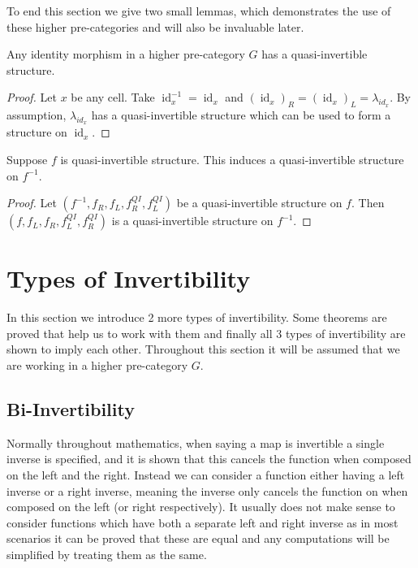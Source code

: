 \documentclass[draft]{article}
\theoremstyle{definition} \newtheorem{definition}{Definition}
\theoremstyle{remark} \newtheorem{remark}{Remark}
\DeclareMathOperator{\id}{id}
\newcommand{\inv}[1]{#1^{-1}} \newcommand{\comp}{\star}
\begin{document}
To end this section we give two small lemmas, which demonstrates the
use of these higher pre-categories and will also be invaluable later.

\begin{lemma}\label{identity}
  Any identity morphism in a higher pre-category \(G\) has a
  quasi-invertible structure.
\end{lemma}

\begin{proof}
  Let \(x\) be any cell. Take \(\inv {\id_x} = \id_x\) and
  \({(\id_x)}_R = {(\id_x)}_L = \lambda_{id_x}\). By assumption,
  \(\lambda_{id_x}\) has a quasi-invertible structure which can be
  used to form a structure on \(\id_x\).
\end{proof}

\begin{lemma}\label{inverse-invert}
  Suppose \(f\) is quasi-invertible structure. This induces a
  quasi-invertible structure on \(\inv f\).
\end{lemma}

\begin{proof}
  Let \((\inv f, f_R, f_L, f_R^{QI}, f_L^{QI})\) be a quasi-invertible
  structure on \(f\). Then \((f , f_L, f_R, f_L^{QI}, f_R^{QI})\) is a
  quasi-invertible structure on \(\inv f\).
\end{proof}

\section{Types of Invertibility}\label{sec:invertibility}

In this section we introduce 2 more types of invertibility. Some
theorems are proved that help us to work with them and finally all 3
types of invertibility are shown to imply each other. Throughout this
section it will be assumed that we are working in a higher
pre-category \(G\).

\subsection{Bi-Invertibility}\label{sec:bi-invertibility}

Normally throughout mathematics, when saying a map is invertible a
single inverse is specified, and it is shown that this cancels the
function when composed on the left and the right. Instead we can
consider a function either having a left inverse or a right inverse,
meaning the inverse only cancels the function on when composed on the
left (or right respectively). It usually does not make sense to
consider functions which have both a separate left and right inverse
as in most scenarios it can be proved that these are equal and any
computations will be simplified by treating them as the same.
\end{document}
